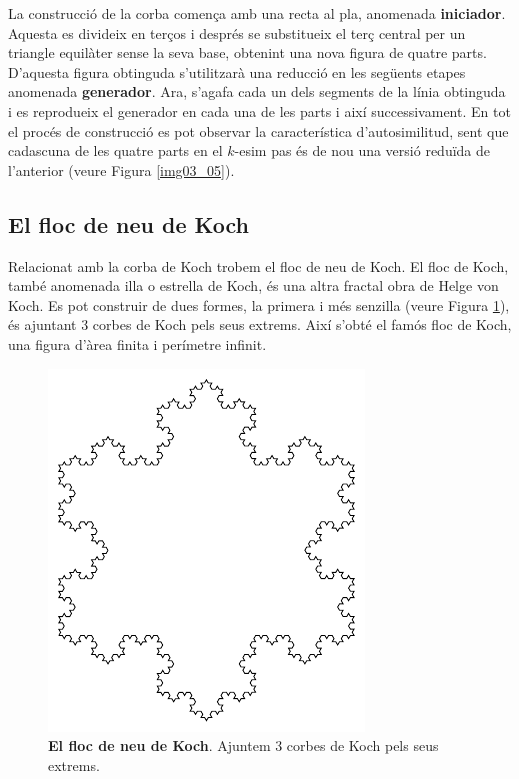 \documentclass[12pt,a4paper]{report}
\begin{document}
La construcció de la corba comença amb una recta al pla, anomenada \textbf{iniciador}. Aquesta es divideix en terços i després se substitueix el terç central per un triangle equilàter sense la seva base, obtenint una nova figura de  quatre parts. D'aquesta figura obtinguda s'utilitzarà una reducció en les següents etapes anomenada \textbf{generador}. Ara, s'agafa cada un dels segments de la línia obtinguda i es reprodueix el generador en cada una de les parts i així successivament. En tot el procés de construcció es pot observar la característica d'autosimilitud, sent que cadascuna de les quatre parts en el  $k$-esim pas és de nou una versió reduïda de l'anterior (veure Figura \ref{img03_05}).
\subsection{El floc de neu de Koch}
Relacionat amb la corba de Koch trobem el floc de neu de Koch.  El floc de Koch, també anomenada illa o estrella de Koch, és una altra fractal obra de Helge von Koch. Es pot construir de dues formes, la primera i més senzilla (veure Figura \ref{img03_06}), és ajuntant 3 corbes de Koch pels seus extrems. Així s'obté el famós floc de Koch, una figura d'àrea finita i perímetre infinit. 

\begin{figure}[!ht]
\centering
\includegraphics[scale=1]{img/img03_06_koch.pdf}
\caption{\textbf{El floc de neu de Koch}. Ajuntem 3 corbes de Koch pels seus extrems.}
\label{img03_06}
\end{figure}
%
\end{document}
